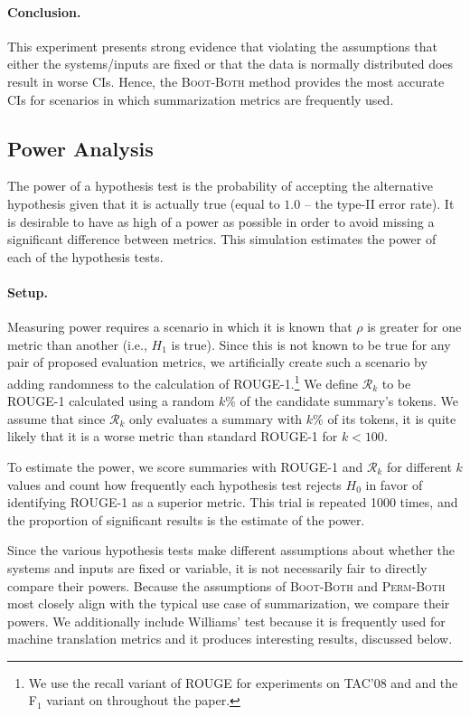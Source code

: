 \paragraph{Conclusion.}
This experiment presents strong evidence that violating the assumptions that either the systems/inputs are fixed or that the data is normally distributed does result in worse CIs.
Hence, the \textsc{Boot-Both} method provides the most accurate CIs for scenarios in which summarization metrics are frequently used.

\subsection{Power Analysis}
\label{sec:power}
The power of a hypothesis test is the probability of accepting the alternative hypothesis given that it is actually true (equal to $1.0$ -- the type-II error rate).
It is desirable to have as high of a power as possible in order to avoid missing a significant difference between metrics.
This simulation estimates the power of each of the hypothesis tests.

\paragraph{Setup.}
Measuring power requires a scenario in which it is known that $\rho$ is greater for one metric than another (i.e., $H_1$ is true).
Since this is not known to be true for any pair of proposed evaluation metrics, we artificially create such a scenario by adding randomness to the calculation of ROUGE-1.\footnote{
    We use the recall variant of ROUGE for experiments on TAC'08 and \citet{BGALN20} and the F$_1$ variant on \citet{FKMSR21} throughout the paper.
}
We define $\mathcal{R}_k$ to be ROUGE-1 calculated using a random $k\%$ of the candidate summary's tokens.
We assume that since $\mathcal{R}_k$ only evaluates a summary with $k\%$ of its tokens, it is quite likely that it is a worse metric than standard ROUGE-1 for $k < 100$.

To estimate the power, we score summaries with ROUGE-1 and $\mathcal{R}_k$ for different $k$ values and count how frequently each hypothesis test rejects $H_0$ in favor of identifying ROUGE-1 as a superior metric.
This trial is repeated 1000 times, and the proportion of significant results is the estimate of the power.

Since the various hypothesis tests make different assumptions about whether the systems and inputs are fixed or variable, it is not necessarily fair to directly compare their powers.
Because the assumptions of \textsc{Boot-Both} and \textsc{Perm-Both} most closely align with the typical use case of summarization, we compare their powers.
We additionally include Williams' test because it is frequently used for machine translation metrics and it produces interesting results, discussed below.


